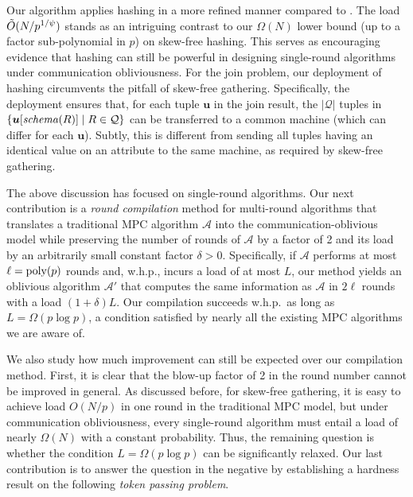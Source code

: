 \documentclass[sigconf]{acmart}
\def\vgap{\vspace{0mm}}
\def\extraspacing{\vspace{1mm} \noindent}
\def\A{\mathcal{A}}
\def\Q{\mathcal{Q}}
\def\schema{\mathit{schema}}
\begin{document}
\vgap

Our algorithm applies hashing in a more refined manner compared to \cite{kbs16}. The load $\tilde{O}(N/p^{1/\psi})$ stands as an intriguing contrast to our $\Omega(N)$ lower bound (up to a factor sub-polynomial in $p$) on skew-free hashing. This serves as encouraging evidence that hashing can still be powerful in designing single-round algorithms under communication obliviousness. For the join problem, our deployment of hashing circumvents the pitfall of skew-free gathering. Specifically, the deployment ensures that, for each tuple $\bm{u}$ in the join result, the $|\Q|$ tuples in $\set{\bm{u}[\schema(R)] \mid R \in \Q}$ can be transferred to a common machine (which can differ for each $\bm{u}$). Subtly, this is different from sending all tuples having an identical value on an attribute to the same machine, as required by skew-free gathering.

\extraspacing {\bf Round-Doubling Compilation.} The above discussion has focused on single-round algorithms. Our next contribution is a {\em round compilation} method for multi-round algorithms that translates a traditional MPC algorithm $\A$ into the communication-oblivious model while preserving the number of rounds of $\A$ by a factor of 2 and its load by an arbitrarily small constant factor $\delta > 0$. Specifically, if $\A$ performs at most $\ell = \operatorname*{poly}(p)$ rounds and, w.h.p., incurs a load of at most $L$, our method yields an oblivious algorithm $\A'$ that computes the same information as $\A$ in $2\ell$ rounds with a load $(1+\delta) L$. Our compilation succeeds w.h.p.\ as long as $L = \Omega(p \log p)$, a condition satisfied by nearly all the existing MPC algorithms we are aware of.

\vgap

We also study how much improvement can still be expected over our compilation method. First, it is clear that the blow-up factor of 2 in the round number cannot be improved in general. As discussed before, for skew-free gathering, it is easy to achieve load $O(N/p)$ in one round in the traditional MPC model, but under communication obliviousness, every single-round algorithm must entail a load of nearly $\Omega(N)$ with a constant probability. Thus, the remaining question is whether the condition $L = \Omega(p \log p)$ can be significantly relaxed. Our last contribution is to answer the question in the negative by establishing a hardness result on the following {\em token passing problem}.

\vgap
\end{document}
